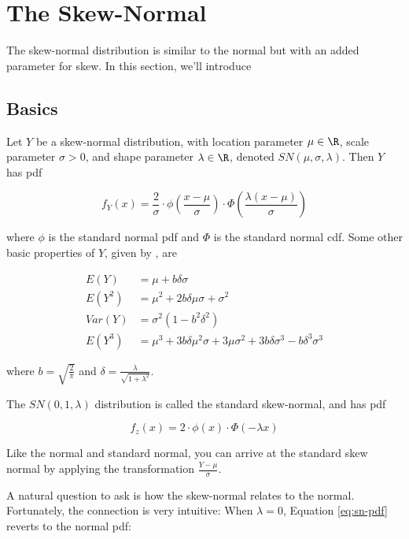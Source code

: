 \documentclass{article}
\begin{document}
\section{The Skew-Normal}

The skew-normal distribution is similar to the normal but with an added
parameter for skew. In this section, we'll introduce

\subsection{Basics}

Let $Y$ be a skew-normal distribution, with location parameter $\mu \in \R$,
scale parameter $\sigma > 0$, and shape parameter $\lambda \in \R$, denoted
$SN(\mu, \sigma, \lambda)$. Then $Y$ has pdf

\begin{equation} \label{eq:sn-pdf}
  f_Y(x) = \frac2\sigma \cdot \phi \left( \frac{x-\mu}{\sigma} \right) \cdot \Phi \left( \frac{\lambda(x-\mu)}{\sigma} \right)
\end{equation}

where $\phi$ is the standard normal pdf and $\Phi$ is the standard normal cdf.
Some other basic properties of $Y$, given by \citet{pewsey}, are

\begin{align}
  E(Y) &= \mu + b \delta \sigma \nonumber \\
  E(Y^2) &= \mu^2 + 2b \delta \mu \sigma + \sigma^2 \label{eq:sn-basic-properties} \\
  Var(Y) &= \sigma^2 (1 - b^2 \delta^2) \nonumber \\
  E(Y^3) &= \mu^3 + 3 b \delta \mu^2 \sigma + 3 \mu \sigma^2 + 3 b \delta \sigma^3 - b \delta^3 \sigma^3 \nonumber
\end{align}

where $b = \sqrt{\frac{2}{\pi}}$ and $\delta = \frac{\lambda}{\sqrt{1 +
\lambda^2}}$.

The $SN(0,1,\lambda)$ distribution is called the standard skew-normal, and has
pdf

\begin{equation} \label{eq:standard-sn-pdf}
  f_z(x) = 2 \cdot \phi(x) \cdot \Phi (-\lambda x)
\end{equation}

Like the normal and standard normal, you can arrive at the standard skew normal
by applying the transformation $\frac{Y - \mu}{\sigma}$.

A natural question to ask is how the skew-normal relates to the normal.
Fortunately, the connection is very intuitive: When $\lambda = 0$, Equation
\eqref{eq:sn-pdf} reverts to the normal pdf:
\end{document}
